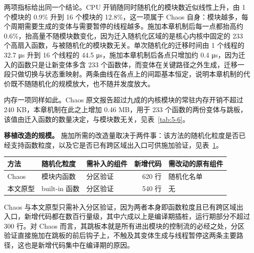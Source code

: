 两项指标给出同一个结论。CPU 开销随同时随机化的模块数近似线性上升，由 1 个模块的 0.9\% 升到 16 个模块的 12.8\%，这一项属于 Chaos 自身：模块越多，每个周期需要生成的变体与需要暂停的线程越多。施加本章机制后每一点都抬高约 0.6\%，抬高量不随模块数变化，因为迁入随机化区域的是核心内核中固定的 233 个高扇入函数，与被随机化的模块数无关。单次随机化的迁移时间由 1 个线程的 32.7 μs 升到 16 个线程的 44.5 μs，施加本章机制后各点只增加约 0.4 μs，因为迁入的函数只是让新变体多含 233 个函数体，而变体在关键路径之外生成，迁移一段只做切换与状态重映射。两条曲线在各点上的间距基本恒定，说明本章机制的代价既不随随机化的规模放大，也不随并发度放大。

内存一项同样如此。Chaos 原文报告超过九成的内核模块的常驻内存开销不超过 240 KB，本章机制在此之上增加 0.46 MB，用于 233 个函数的两份变体与跳板，该值由迁入函数的数量决定，与模块数无关，见表~\ref{tab:5-6}。

\textbf{移植改造的规模。} 施加所需的改造量取决于两件事：该方法的随机化粒度是否已经支持函数粒度，以及它是否已有跨区域出入口可供施加验证，见表~\ref{tab:5-7}。

\begin{table}[!htbp]
    \label{tab:5-7}
    \centering
    \footnotesize
    \setlength{\tabcolsep}{3pt}
    \renewcommand{\arraystretch}{1.25}
    \begin{tabular}{>{\raggedright\arraybackslash}p{}>{\raggedright\arraybackslash}p{}>{\raggedright\arraybackslash}p{}r>{\raggedright\arraybackslash}p{}}
        \hline
        方法 & 随机化粒度 & 需补入的组件 & 新增代码 & 需改动的原有组件\\
        \hline
        Chaos & 模块内函数 & 分区验证 & 620 行 & 随机化名单\\
        本文原型 & built-in 函数 & 分区验证 & 540 行 & 无\\
        \hline
    \end{tabular}
\end{table}

Chaos 与本文原型只需补入分区验证，因为两者本身即函数粒度且已有跨区域出入口，新增代码都在数百行量级，其中六成以上是编译期插桩，运行期部分不超过 300 行。对 Chaos 而言，其跳板本就是所有进出模块的控制流的必经之处，分区验证直接施加在跳板的前后钩子上，不触及其变体生成与线程暂停这两条主要路径，这也是新增代码集中在编译期的原因。

